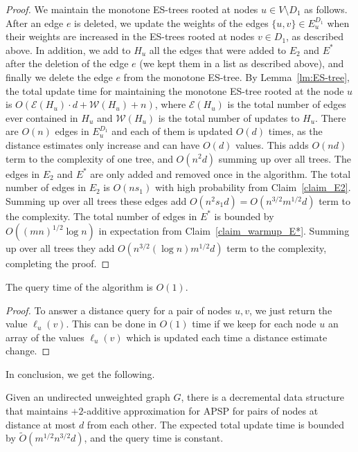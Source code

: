 \begin{proof}
We maintain the monotone ES-trees rooted at nodes $u \in V \setminus D_1$ as follows. After an edge $e$ is deleted, we update the weights of the edges $\{u,v\} \in E_u^{D_1}$ when their weights are increased in the ES-trees rooted at nodes $v \in D_1$, as described above. In addition, we add to $H_u$ all the edges that were added to $E_2$ and $E^*$ after the deletion of the edge $e$ (we kept them in a list as described above), and finally we delete the edge $e$ from the monotone ES-tree. By Lemma~\ref{lm:ES-tree}, the total update time for maintaining the monotone ES-tree rooted at the node $u$ is 
$O(\mathcal E(H_u)\cdot d+\mathcal W(H_u)+n)$, where $\mathcal E(H_u)$ is the total number of edges ever contained in $H_u$ and $\mathcal W(H_u)$ is the total number of updates to $H_u$. There are $O(n)$ edges in $E_u^{D_1}$ and each of them is updated $O(d)$ times, as the distance estimates only increase and can have $O(d)$ values. This adds $O(nd)$ term to the complexity of one tree, and $O(n^2 d)$ summing up over all trees. The edges in $E_2$ and $E^*$ are only added and removed once in the algorithm. The total number of edges in $E_2$ is $O(ns_1)$ with high probability from Claim~\ref{claim_E2}. Summing up over all trees these edges add $O(n^2 s_1 d)= O(n^{3/2} m^{1/2} d)$ term to the complexity. The total number of edges in $E^*$ is bounded by $O( (mn)^{1/2}\log{n} )$ in expectation from Claim~\ref{claim_warmup_E*}. Summing up over all trees they add $O(n^{3/2} (\log{n}) m^{1/2} d)$ term to the complexity, completing the proof.
\end{proof} 

\begin{claim}
The query time of the algorithm is $O(1)$.
\end{claim}

\begin{proof}
To answer a distance query for a pair of nodes $u,v$, we just return the value $\ell_u(v)$. This can be done in $O(1)$ time if we keep for each node $u$ an array of the values $\ell_u(v)$ which is updated each time a distance estimate change.
\end{proof}

In conclusion, we get the following.

\begin{theorem}
Given an undirected unweighted graph $G$, there is a decremental data structure that maintains $+2$-additive approximation for APSP for pairs of nodes at distance at most $d$ from each other. The expected total update time is bounded by $\tilde{O}(m^{1/2}n^{3/2}d)$, and the query time is constant.
\end{theorem}%

